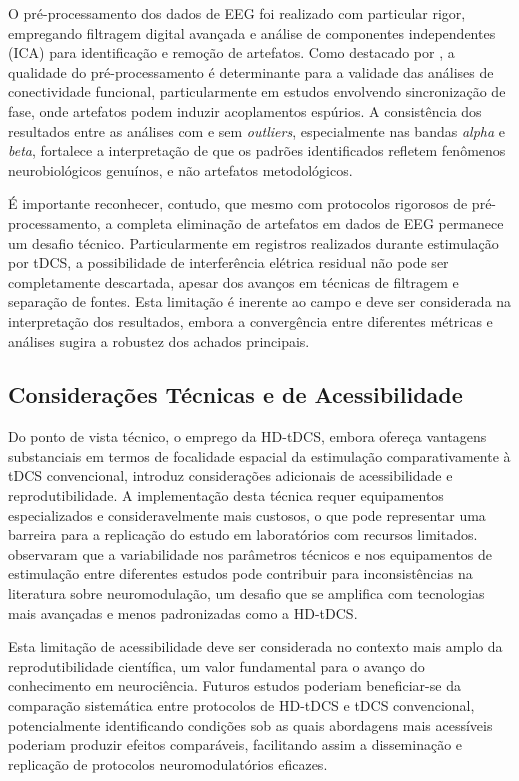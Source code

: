 O pré-processamento dos dados de EEG foi realizado com particular rigor, empregando filtragem digital avançada e análise de componentes independentes (ICA) para identificação e remoção de artefatos. Como destacado por \cite{cohen2017where}, a qualidade do pré-processamento é determinante para a validade das análises de conectividade funcional, particularmente em estudos envolvendo sincronização de fase, onde artefatos podem induzir acoplamentos espúrios. A consistência dos resultados entre as análises com e sem \textit{outliers}, especialmente nas bandas \emph{alpha} e \emph{beta}, fortalece a interpretação de que os padrões identificados refletem fenômenos neurobiológicos genuínos, e não artefatos metodológicos.

É importante reconhecer, contudo, que mesmo com protocolos rigorosos de pré-processamento, a completa eliminação de artefatos em dados de EEG permanece um desafio técnico. Particularmente em registros realizados durante estimulação por tDCS, a possibilidade de interferência elétrica residual não pode ser completamente descartada, apesar dos avanços em técnicas de filtragem e separação de fontes. Esta limitação é inerente ao campo e deve ser considerada na interpretação dos resultados, embora a convergência entre diferentes métricas e análises sugira a robustez dos achados principais.

\subsection{Considerações Técnicas e de Acessibilidade}
Do ponto de vista técnico, o emprego da HD-tDCS, embora ofereça vantagens substanciais em termos de focalidade espacial da estimulação comparativamente à tDCS convencional, introduz considerações adicionais de acessibilidade e reprodutibilidade. A implementação desta técnica requer equipamentos especializados e consideravelmente mais custosos, o que pode representar uma barreira para a replicação do estudo em laboratórios com recursos limitados. \cite{kunze2014high} observaram que a variabilidade nos parâmetros técnicos e nos equipamentos de estimulação entre diferentes estudos pode contribuir para inconsistências na literatura sobre neuromodulação, um desafio que se amplifica com tecnologias mais avançadas e menos padronizadas como a HD-tDCS.

Esta limitação de acessibilidade deve ser considerada no contexto mais amplo da reprodutibilidade científica, um valor fundamental para o avanço do conhecimento em neurociência. Futuros estudos poderiam beneficiar-se da comparação sistemática entre protocolos de HD-tDCS e tDCS convencional, potencialmente identificando condições sob as quais abordagens mais acessíveis poderiam produzir efeitos comparáveis, facilitando assim a disseminação e replicação de protocolos neuromodulatórios eficazes.


